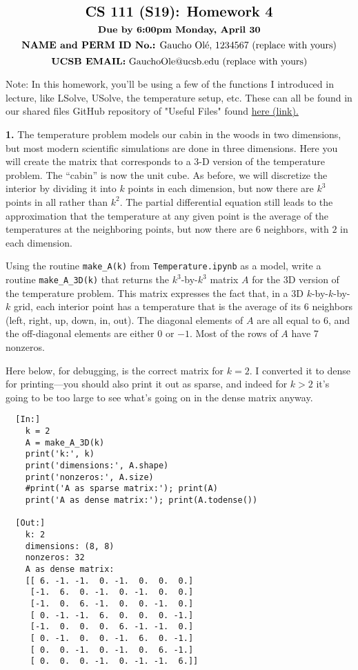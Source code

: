 \documentclass[11pt]{article}
\begin{document}
$$\mbox{\Large \textbf {CS 111 (S19): Homework 4}}$$
$$\mbox{\textbf {Due by 6:00pm Monday, April 30}}$$
$$\mbox{\textbf {NAME and PERM ID No.:} Gaucho Ol\'e, 1234567 (replace with yours)}$$
$$\mbox{\textbf {UCSB EMAIL:} GauchoOle@ucsb.edu (replace with yours)}$$

Note: In this homework, you'll be using a few of the functions I introduced in lecture, 
like LSolve, USolve, the temperature setup, etc. These can all be found in our shared 
files GitHub repository of "Useful Files" found
\href{https://github.com/ucsb-cs111/s19-lecture-files/tree/master/UsefulFiles}
{here (link).}

\par\bigskip
{\bf 1.}
The temperature problem models our cabin in the woods in two dimensions,
but most modern scientific simulations are done in three dimensions.
Here you will create the matrix that corresponds to a 3-D version of 
the temperature problem. The ``cabin'' is now the unit cube. As before,
we will discretize the interior by dividing it into $k$ points in each
dimension, but now there are $k^3$ points in all rather than $k^2$.
The partial differential equation still leads to the approximation
that the temperature at any given point is the average of the temperatures
at the neighboring points, but now there are 6 neighbors, 
with $2$ in each dimension.

Using the routine {\tt make\_A(k)} from {\tt Temperature.ipynb} as a model, 
write a routine {\tt make\_A\_3D(k)} that returns the $k^3$-by-$k^3$ 
matrix $A$ for the 3D version of the temperature problem.
This matrix expresses the fact that, in a 3D $k$-by-$k$-by-$k$ grid, 
each interior point has a temperature that is the average of its 6 neighbors 
(left, right, up, down, in, out).
The diagonal elements of $A$ are all equal to $6$, 
and the off-diagonal elements are either $0$ or $-1$.
Most of the rows of $A$ have 7 nonzeros.

Here below, for debugging, is the correct matrix for $k=2$.
I converted it to dense for printing---you should also
print it out as sparse, and indeed for $k>2$ it's going to be too
large to see what's going on in the dense matrix anyway.

\begin{verbatim}
  [In:]
    k = 2
    A = make_A_3D(k)
    print('k:', k)
    print('dimensions:', A.shape)
    print('nonzeros:', A.size)
    #print('A as sparse matrix:'); print(A)
    print('A as dense matrix:'); print(A.todense())

  [Out:]
    k: 2
    dimensions: (8, 8)
    nonzeros: 32
    A as dense matrix:
    [[ 6. -1. -1.  0. -1.  0.  0.  0.]
     [-1.  6.  0. -1.  0. -1.  0.  0.]
     [-1.  0.  6. -1.  0.  0. -1.  0.]
     [ 0. -1. -1.  6.  0.  0.  0. -1.]
     [-1.  0.  0.  0.  6. -1. -1.  0.]
     [ 0. -1.  0.  0. -1.  6.  0. -1.]
     [ 0.  0. -1.  0. -1.  0.  6. -1.]
     [ 0.  0.  0. -1.  0. -1. -1.  6.]]
\end{verbatim}
\end{document}
